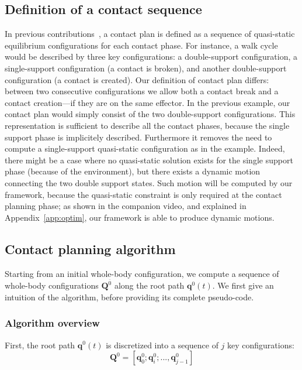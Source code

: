 \subsection{Definition of a contact sequence}
In previous contributions~\citep{DBLP:conf/iser/EscandeKMG08}, a contact plan is defined as a sequence of quasi-static equilibrium configurations
for each contact phase. For instance, a walk cycle would be described by three key configurations: a double-support configuration, a single-support configuration (a contact is broken), and another double-support configuration (a contact is created). 
Our definition of contact plan differs: between two consecutive configurations we allow both a contact break and a contact creation---if they are on the same effector. 
In the previous example, our contact plan would simply consist of the two double-support configurations. 
This representation is sufficient to describe all the contact phases, because the single support phase is implicitely described. Furthermore it removes the need to compute a single-support quasi-static configuration as in the example. Indeed, there might be a case where no quasi-static solution exists for the single support phase (because of the environment), but
there exists a dynamic motion connecting the two double support states. Such motion will be computed by our framework, because the quasi-static constraint is only required at the contact planning phase; as shown in the companion video, and explained in Appendix~\ref{app:optim}, our framework is able to produce dynamic motions.

\subsection{Contact planning algorithm}
Starting from an initial whole-body configuration, we compute a sequence
of whole-body configurations  $\mathbf{Q}^{\overline{0}}$ along the root path $\mathbf{q}^0(t)$.
We first give an intuition of the algorithm, before providing its complete pseudo-code.
\subsubsection{Algorithm overview}
First, the root path $\mathbf{q}^0(t)$ is discretized into a sequence of $j$ key configurations:  
\begin{equation*}
	\mathbf{Q}^0 = [\mathbf{q}^0_{0}; \mathbf{q}^0_{i}; ..., \mathbf{q}^0_{j-1}]
\end{equation*} 

